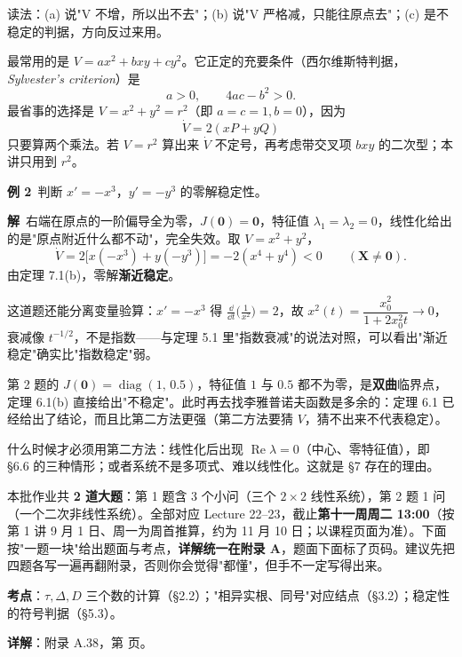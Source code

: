 \documentclass[11pt]{ctexart}
\renewcommand{\qbreak}{\needspace{0.26\textheight}}
\newcommand{\X}{\mathbf{X}}\newcommand{\Y}{\mathbf{Y}}
\newcommand{\Jac}{J}
\newcommand{\EN}[1]{\textcolor{inkgray}{\itshape #1}}
\begin{document}
读法：(a) 说"V 不增，所以出不去"；(b) 说"V 严格减，只能往原点去"；(c) 是不稳定的判据，方向反过来用。


最常用的是 $V=ax^{2}+bxy+cy^{2}$。它正定的充要条件（西尔维斯特判据，\EN{Sylvester's criterion}）是
\[
a>0,\qquad 4ac-b^{2}>0 .
\tag{7.1}
\]
最省事的选择是 $V=x^{2}+y^{2}=r^{2}$（即 $a=c=1,b=0$），因为
\[
\dot V=2(xP+yQ)
\]
只要算两个乘法。若 $V=r^{2}$ 算出来 $\dot V$ 不定号，再考虑带交叉项 $bxy$ 的二次型；本讲只用到 $r^{2}$。


\textbf{例 2}\ 判断 $x'=-x^{3}$，$y'=-y^{3}$ 的零解稳定性。

\textbf{解}\ 右端在原点的一阶偏导全为零，$\Jac(\mathbf{0})=\mathbf{0}$，特征值 $\lambda_{1}=\lambda_{2}=0$，线性化给出的是"原点附近什么都不动"，完全失效。取 $V=x^{2}+y^{2}$，
\[
\dot V=2\big[x(-x^{3})+y(-y^{3})\big]=-2(x^{4}+y^{4})<0\qquad(\X\neq\mathbf{0}).
\]
由定理 7.1(b)，零解\textbf{渐近稳定}。

这道题还能分离变量验算：$x'=-x^{3}$ 得 $\frac{\dd}{\dd t}\big(\frac{1}{x^{2}}\big)=2$，故 $x^{2}(t)=\dfrac{x_0^{2}}{1+2x_0^{2}t}\to0$，衰减像 $t^{-1/2}$，不是指数——与定理 5.1 里"指数衰减"的说法对照，可以看出"渐近稳定"确实比"指数稳定"弱。


第 2 题的 $\Jac(\mathbf{0})=\operatorname{diag}(1,\,0.5)$，特征值 $1$ 与 $0.5$ 都不为零，是\textbf{双曲}临界点，定理 6.1(b) 直接给出"不稳定"。此时再去找李雅普诺夫函数是多余的：定理 6.1 已经给出了结论，而且比第二方法更强（第二方法要猜 $V$，猜不出来不代表稳定）。

什么时候才必须用第二方法：线性化后出现 $\operatorname{Re}\lambda=0$（中心、零特征值），即 §6.6 的三种情形；或者系统不是多项式、难以线性化。这就是 §7 存在的理由。

\needspace{0.32\textheight}

本批作业共 \textbf{2 道大题}：第 1 题含 3 个小问（三个 $2\times2$ 线性系统），第 2 题 1 问（一个二次非线性系统）。全部对应 Lecture 22--23，截止\textbf{第十一周周二 13:00}（按第 1 讲 9 月 1 日、周一为周首推算，约为 11 月 10 日；以课程页面为准）。下面按"一题一块"给出题面与考点，\textbf{详解统一在附录 A}，题面下面标了页码。建议先把四题各写一遍再翻附录，否则你会觉得"都懂"，但手不一定写得出来。

\qbreak
{}
\textbf{考点}：$\tau,\Delta,D$ 三个数的计算（§2.2）；"相异实根、同号"对应结点（§3.2）；稳定性的符号判据（§5.3）。
\par\textbf{详解}：附录 A.38，第 \pageref{c6:app:a1} 页。
\end{document}

